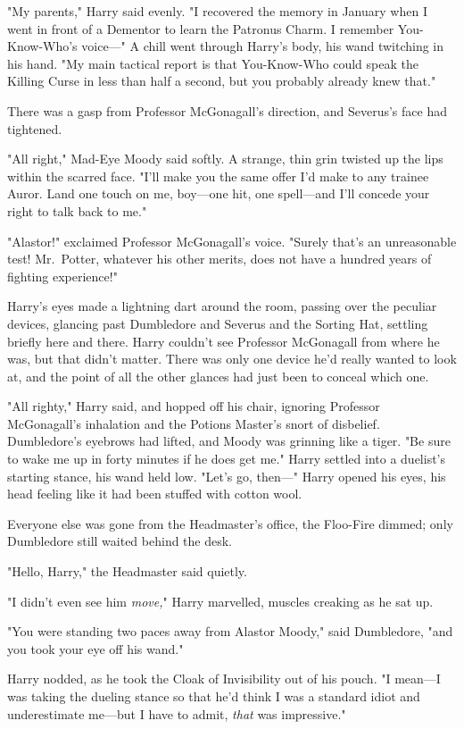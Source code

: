 "My parents," Harry said evenly. "I recovered the memory in January when I went 
in front of a Dementor to learn the Patronus Charm. I remember You-Know-Who's 
voice---" A chill went through Harry's body, his wand twitching in his hand. 
"My main tactical report is that You-Know-Who could speak the Killing Curse in 
less than half a second, but you probably already knew that."

There was a gasp from Professor McGonagall's direction, and Severus's face had 
tightened.

"All right," Mad-Eye Moody said softly. A strange, thin grin twisted up the 
lips within the scarred face. "I'll make you the same offer I'd make to any 
trainee Auror. Land one touch on me, boy---one hit, one spell---and I'll 
concede your right to talk back to me."

"Alastor!" exclaimed Professor McGonagall's voice. "Surely that's an 
unreasonable test! Mr.~Potter, whatever his other merits, does not have a 
hundred years of fighting experience!"

Harry's eyes made a lightning dart around the room, passing over the peculiar 
devices, glancing past Dumbledore and Severus and the Sorting Hat, settling 
briefly here and there. Harry couldn't see Professor McGonagall from where he 
was, but that didn't matter. There was only one device he'd really wanted to 
look at, and the point of all the other glances had just been to conceal which 
one.

"All righty," Harry said, and hopped off his chair, ignoring Professor 
McGonagall's inhalation and the Potions Master's snort of disbelief. 
Dumbledore's eyebrows had lifted, and Moody was grinning like a tiger. "Be sure 
to wake me up in forty minutes if he does get me." Harry settled into a 
duelist's starting stance, his wand held low. "Let's go, then---"
\sbreak
Harry opened his eyes, his head feeling like it had been stuffed with cotton 
wool.

Everyone else was gone from the Headmaster's office, the Floo-Fire dimmed; only 
Dumbledore still waited behind the desk.

"Hello, Harry," the Headmaster said quietly.

"I didn't even see him \emph{move,}" Harry marvelled, muscles creaking as he 
sat up.

"You were standing two paces away from Alastor Moody," said Dumbledore, "and 
you took your eye off his wand."

Harry nodded, as he took the Cloak of Invisibility out of his pouch. "I 
mean---I was taking the dueling stance so that he'd think I was a standard 
idiot and underestimate me---but I have to admit, \emph{that} was impressive."

